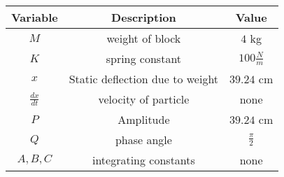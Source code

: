      \begin{tabular}{|c|c|c|} 
      \hline
\textbf{Variable}& \textbf{Description}& \textbf{Value}\\\hline
         $M$& weight of block &$4$ kg\\\hline
          $K$ & spring constant & $100\frac{N}{m}$  \\\hline
          $x$& Static deflection due to weight&$39.24$ cm\\\hline
            $\frac{dx}{dt}$& velocity of particle & none \\\hline
          $P$& Amplitude & $39.24$ cm\\\hline
          $Q$& phase angle & $\frac{\pi}{2}$ \\ \hline
          $ A,B,C $& integrating constants & none \\ \hline
    \end{tabular}
